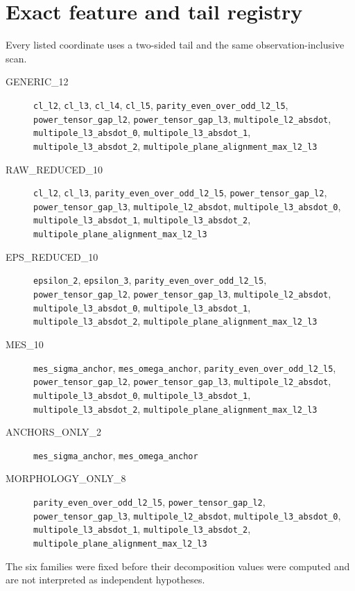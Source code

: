 \documentclass[11pt]{article}
\begin{document}
\section{Exact feature and tail registry}
Every listed coordinate uses a two-sided tail and the same observation-inclusive scan.
\begin{description}
\item[GENERIC\_12] \texttt{cl\_l2}, \texttt{cl\_l3}, \texttt{cl\_l4}, \texttt{cl\_l5}, \texttt{parity\_even\_over\_odd\_l2\_l5}, \texttt{power\_tensor\_gap\_l2}, \texttt{power\_tensor\_gap\_l3}, \texttt{multipole\_l2\_absdot}, \texttt{multipole\_l3\_absdot\_0}, \texttt{multipole\_l3\_absdot\_1}, \texttt{multipole\_l3\_absdot\_2}, \texttt{multipole\_plane\_alignment\_max\_l2\_l3}
\item[RAW\_REDUCED\_10] \texttt{cl\_l2}, \texttt{cl\_l3}, \texttt{parity\_even\_over\_odd\_l2\_l5}, \texttt{power\_tensor\_gap\_l2}, \texttt{power\_tensor\_gap\_l3}, \texttt{multipole\_l2\_absdot}, \texttt{multipole\_l3\_absdot\_0}, \texttt{multipole\_l3\_absdot\_1}, \texttt{multipole\_l3\_absdot\_2}, \texttt{multipole\_plane\_alignment\_max\_l2\_l3}
\item[EPS\_REDUCED\_10] \texttt{epsilon\_2}, \texttt{epsilon\_3}, \texttt{parity\_even\_over\_odd\_l2\_l5}, \texttt{power\_tensor\_gap\_l2}, \texttt{power\_tensor\_gap\_l3}, \texttt{multipole\_l2\_absdot}, \texttt{multipole\_l3\_absdot\_0}, \texttt{multipole\_l3\_absdot\_1}, \texttt{multipole\_l3\_absdot\_2}, \texttt{multipole\_plane\_alignment\_max\_l2\_l3}
\item[MES\_10] \texttt{mes\_sigma\_anchor}, \texttt{mes\_omega\_anchor}, \texttt{parity\_even\_over\_odd\_l2\_l5}, \texttt{power\_tensor\_gap\_l2}, \texttt{power\_tensor\_gap\_l3}, \texttt{multipole\_l2\_absdot}, \texttt{multipole\_l3\_absdot\_0}, \texttt{multipole\_l3\_absdot\_1}, \texttt{multipole\_l3\_absdot\_2}, \texttt{multipole\_plane\_alignment\_max\_l2\_l3}
\item[ANCHORS\_ONLY\_2] \texttt{mes\_sigma\_anchor}, \texttt{mes\_omega\_anchor}
\item[MORPHOLOGY\_ONLY\_8] \texttt{parity\_even\_over\_odd\_l2\_l5}, \texttt{power\_tensor\_gap\_l2}, \texttt{power\_tensor\_gap\_l3}, \texttt{multipole\_l2\_absdot}, \texttt{multipole\_l3\_absdot\_0}, \texttt{multipole\_l3\_absdot\_1}, \texttt{multipole\_l3\_absdot\_2}, \texttt{multipole\_plane\_alignment\_max\_l2\_l3}
\end{description}
The six families were fixed before their decomposition values were computed and are not interpreted as independent hypotheses.
\end{document}
